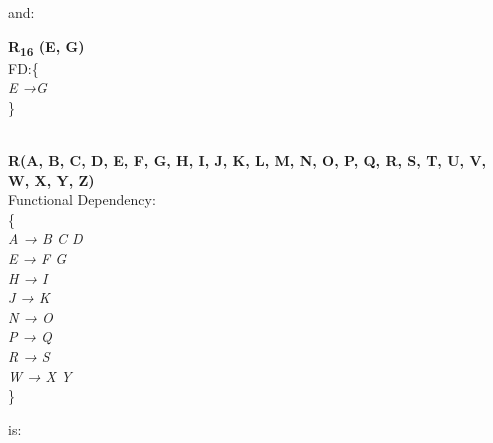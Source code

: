 and:\\

\begin{adjustwidth}{2cm}{}
\textbf{R\textsubscript{16} (E, G)}\\
FD:\{\\
\textit{
E →G\\
}
\} \\ \\
\end{adjustwidth}
















\begin{adjustwidth}{2cm}{}
\textbf{R(A, B, C, D, E, F, G, H, I, J, K, L, M, N, O, P, Q, R, S, T, U, V, W, X, Y, Z)}\\
Functional Dependency:\\
\{\\
\textit{
A → B C D\\
E → F G\\
H → I\\
J → K\\
N → O\\
P → Q\\
R → S\\
W → X Y\\
} 
\}\\
\end{adjustwidth}
is:

